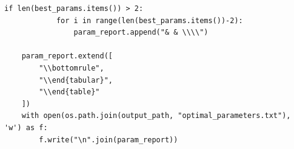 \documentclass[journal]{IEEEtran}
\begin{document}
\begin{lstlisting}[style=python, caption={Utility Functions for Data Processing}, label={lst:utilities}]
        if len(best_params.items()) > 2:
            for i in range(len(best_params.items())-2):
                param_report.append("& & \\\\")
                    
    param_report.extend([
        "\\bottomrule",
        "\\end{tabular}",
        "\\end{table}"
    ]) 
    with open(os.path.join(output_path, "optimal_parameters.txt"), 'w') as f:
        f.write("\n".join(param_report))
\end{lstlisting}
\end{document}
